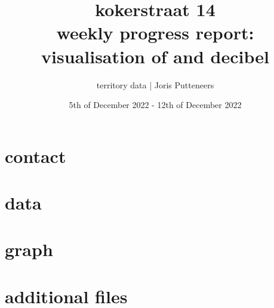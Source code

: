 \documentclass{article}
\author{territory data | Joris Putteneers}
\title{kokerstraat 14\\ \large weekly progress report: visualisation of {} and decibel}
\date{5th of December 2022 - 12th of December 2022}
\begin{document}
  
\maketitle  
\tableofcontents 
\newpage 
\section{contact} 
 
\section{data} 
 
\section{graph} 
 
\section{additional files} 
 
\end{document}
